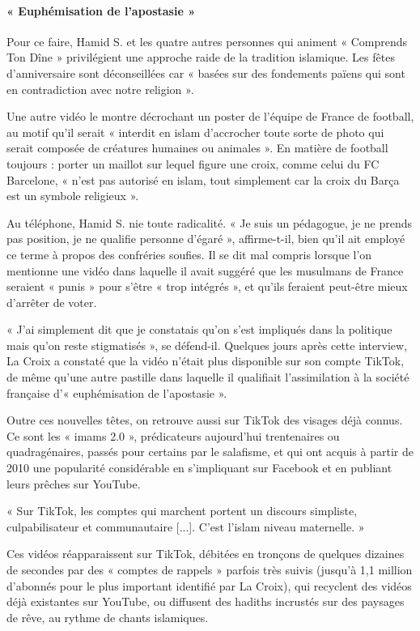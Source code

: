 \paragraph{« Euphémisation de l’apostasie »}
Pour ce faire, Hamid S. et les quatre autres personnes qui animent « Comprends Ton Dîne » privilégient une approche raide de la tradition islamique. Les fêtes d’anniversaire sont déconseillées car « basées sur des fondements païens qui sont en contradiction avec notre religion ».

Une autre vidéo le montre décrochant un poster de l’équipe de France de football, au motif qu’il serait « interdit en islam d’accrocher toute sorte de photo qui serait composée de créatures humaines ou animales ». En matière de football toujours : porter un maillot sur lequel figure une croix, comme celui du FC Barcelone, « n’est pas autorisé en islam, tout simplement car la croix du Barça est un symbole religieux ».


Au téléphone, Hamid S. nie toute radicalité. « Je suis un pédagogue, je ne prends pas position, je ne qualifie personne d’égaré », affirme-t-il, bien qu’il ait employé ce terme à propos des confréries soufies. Il se dit mal compris lorsque l’on mentionne une vidéo dans laquelle il avait suggéré que les musulmans de France seraient « punis » pour s’être « trop intégrés », et qu’ils feraient peut-être mieux d’arrêter de voter.

« J’ai simplement dit que je constatais qu’on s’est impliqués dans la politique mais qu’on reste stigmatisés », se défend-il. Quelques jours après cette interview, La Croix a constaté que la vidéo n’était plus disponible sur son compte TikTok, de même qu’une autre pastille dans laquelle il qualifiait l’assimilation à la société française d’« euphémisation de l’apostasie ».
 

Outre ces nouvelles têtes, on retrouve aussi sur TikTok des visages déjà connus. Ce sont les « imams 2.0 », prédicateurs aujourd’hui trentenaires ou quadragénaires, passés pour certains par le salafisme, et qui ont acquis à partir de 2010 une popularité considérable en s’impliquant sur Facebook et en publiant leurs prêches sur YouTube.

« Sur TikTok, les comptes qui marchent portent un discours simpliste, culpabilisateur et communautaire [...]. C’est l’islam niveau maternelle. »
 

Ces vidéos réapparaissent sur TikTok, débitées en tronçons de quelques dizaines de secondes par des « comptes de rappels » parfois très suivis (jusqu’à 1,1 million d’abonnés pour le plus important identifié par La Croix), qui recyclent des vidéos déjà existantes sur YouTube, ou diffusent des hadiths incrustés sur des paysages de rêve, au rythme de chants islamiques.

